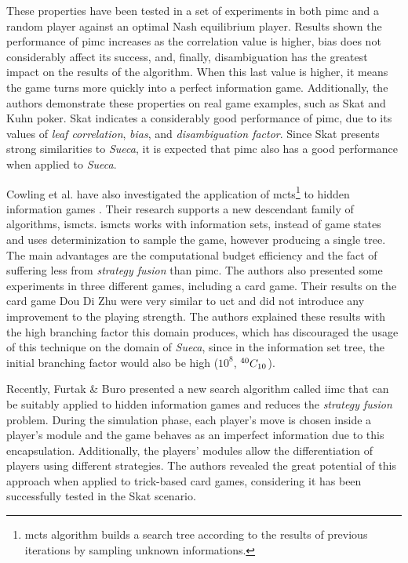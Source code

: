 These properties have been tested in a set of experiments in both \ac{pimc} and a random player against an optimal Nash equilibrium player.
Results shown the performance of \ac{pimc} increases as the correlation value is higher, bias does not considerably affect its success, and, finally, disambiguation has the greatest impact on the results of the algorithm.
When this last value is higher, it means the game turns more quickly into a perfect information game.
Additionally, the authors demonstrate these properties on real game examples, such as Skat and Kuhn poker.
Skat indicates a considerably good performance of \ac{pimc}, due to its values of \emph{leaf correlation}, \emph{bias}, and \emph{disambiguation factor}.
Since Skat presents strong similarities to \emph{Sueca}, it is expected that \ac{pimc} also has a good performance when applied to \emph{Sueca}.


Cowling et al. have also investigated the application of \ac{mcts}\footnote{\ac{mcts} algorithm builds a search tree according to the results of previous iterations by sampling unknown informations.} to hidden information games \cite{Cowling2012}.
Their research supports a new descendant family of algorithms, \ac{ismcts}.
\ac{ismcts} works with information sets, instead of game states and uses determinization to sample the game, however producing a single tree.
The main advantages are the computational budget efficiency and the fact of suffering less from \emph{strategy fusion} than \ac{pimc}.
The authors also presented some experiments in three different games, including a card game.
Their results on the card game Dou Di Zhu were very similar to \ac{uct} and did not introduce any improvement to the playing strength.
The authors explained these results with the high branching factor this domain produces, which has discouraged the usage of this technique on the domain of \emph{Sueca}, since in the information set tree, the initial branching factor would also be high ($10^{8}$, ${}^{40}C_{10}$).


Recently, Furtak \& Buro \cite{Furtak} presented a new search algorithm called \ac{iimc} that can be suitably applied to hidden information games and reduces the \emph{strategy fusion} problem.
During the simulation phase, each player's move is chosen inside a player's module and the game behaves as an imperfect information due to this encapsulation.
Additionally, the players' modules allow the differentiation of players using different strategies.
The authors revealed the great potential of this approach when applied to trick-based card games, considering it has been successfully tested in the Skat scenario.



